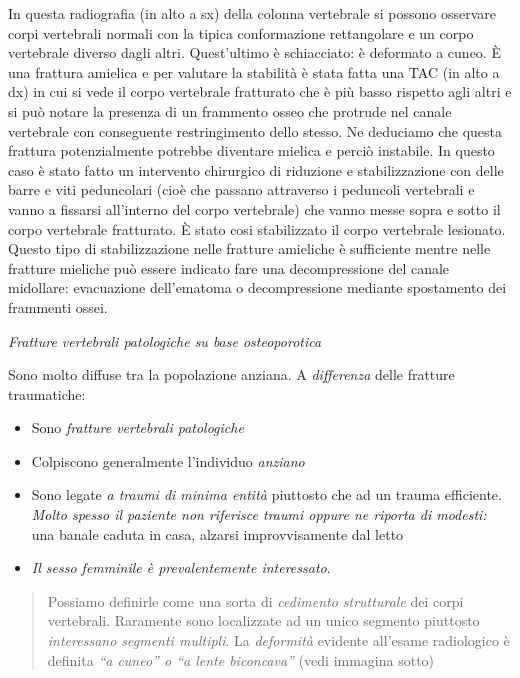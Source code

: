 \documentclass[]{article}
\begin{document}
In questa radiografia (in alto a sx) della colonna vertebrale si possono
osservare corpi vertebrali normali con la tipica conformazione
rettangolare e un corpo vertebrale diverso dagli altri. Quest'ultimo è
schiacciato: è deformato a cuneo. È una frattura amielica e per valutare
la stabilità è stata fatta una TAC (in alto a dx) in cui si vede il
corpo vertebrale fratturato che è più basso rispetto agli altri e si può
notare la presenza di un frammento osseo che protrude nel canale
vertebrale con conseguente restringimento dello stesso. Ne deduciamo che
questa frattura potenzialmente potrebbe diventare mielica e perciò
instabile. In questo caso è stato fatto un intervento chirurgico di
riduzione e stabilizzazione con delle barre e viti peduncolari (cioè che
passano attraverso i peduncoli vertebrali e vanno a fissarsi all'interno
del corpo vertebrale) che vanno messe sopra e sotto il corpo vertebrale
fratturato. È stato cosi stabilizzato il corpo vertebrale lesionato.
Questo tipo di stabilizzazione nelle fratture amieliche è sufficiente
mentre nelle fratture mieliche può essere indicato fare una
decompressione del canale midollare: evacuazione dell'ematoma o
decompressione mediante spostamento dei frammenti ossei.

\emph{Fratture vertebrali patologiche su base osteoporotica}

Sono molto diffuse tra la popolazione anziana. A \emph{differenza} delle
fratture traumatiche:

\begin{itemize}
\item
  Sono \emph{fratture vertebrali patologiche}
\item
  Colpiscono generalmente l'individuo \emph{anziano}
\item
  Sono legate \emph{a traumi di minima entità} piuttosto che ad un
  trauma efficiente. \emph{Molto spesso il paziente non riferisce traumi
  oppure ne riporta di modesti:} una banale caduta in casa, alzarsi
  improvvisamente dal letto
\item
  \emph{Il sesso femminile è prevalentemente interessato}.
\end{itemize}

\begin{quote}
Possiamo definirle come una sorta di \emph{cedimento strutturale} dei
corpi vertebrali. Raramente sono localizzate ad un unico segmento
piuttosto \emph{interessano segmenti multipli}. La \emph{deformità}
evidente all'esame radiologico è definita \emph{``a cuneo'' o ``a lente
biconcava''} (vedi immagina sotto)
\end{quote}
\end{document}
